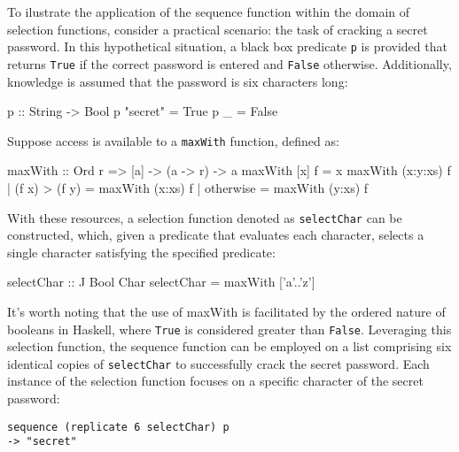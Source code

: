 \documentclass[runningheads]{llncs}
\begin{document}
To ilustrate the application of the sequence function within the domain
of selection functions, consider a practical scenario: the task of
cracking a secret password. In this hypothetical situation, a black box
predicate \texttt{p} is provided that returns \texttt{True} if the
correct password is entered and \texttt{False} otherwise. Additionally,
knowledge is assumed that the password is six characters long:

\begin{code}
p :: String -> Bool
p "secret" = True
p _        = False
\end{code}

Suppose access is available to a \texttt{maxWith} function, defined as:

\begin{code}
maxWith :: Ord r => [a] -> (a -> r) -> a
maxWith [x] f                      = x
maxWith (x:y:xs) f | (f x) > (f y) = maxWith (x:xs) f
                   | otherwise     = maxWith (y:xs) f
\end{code}

With these resources, a selection function denoted as
\texttt{selectChar} can be constructed, which, given a predicate that
evaluates each character, selects a single character satisfying the
specified predicate:

\begin{code}
selectChar :: J Bool Char
selectChar = maxWith ['a'..'z']
\end{code}

It's worth noting that the use of maxWith is facilitated by the ordered
nature of booleans in Haskell, where \texttt{True} is considered greater
than \texttt{False}. Leveraging this selection function, the sequence
function can be employed on a list comprising six identical copies of
\texttt{selectChar} to successfully crack the secret password. Each
instance of the selection function focuses on a specific character of
the secret password:

\begin{verbatim}
sequence (replicate 6 selectChar) p
-> "secret"
\end{verbatim}
\end{document}
